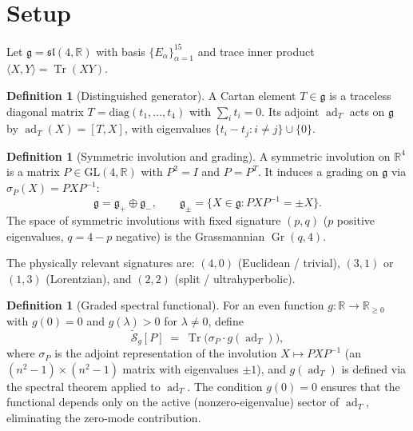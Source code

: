 \documentclass[11pt]{article}
\theoremstyle{plain}
\theoremstyle{definition}
\newtheorem{definition}[theorem]{Definition}
\theoremstyle{remark}
\newcommand{\sln}[1]{\mathfrak{sl}(#1,\mathbb{R})}
\newcommand{\ad}{\operatorname{ad}}
\newcommand{\Tr}{\operatorname{Tr}}
\newcommand{\Gr}{\operatorname{Gr}}
\begin{document}
\section{Setup}

Let $\mathfrak{g} = \sln{4}$ with basis $\{E_\alpha\}_{\alpha=1}^{15}$
and trace inner product $\langle X, Y \rangle = \Tr(XY)$.

\begin{definition}[Distinguished generator]
A Cartan element $T \in \mathfrak{g}$ is a traceless diagonal
matrix $T = \mathrm{diag}(t_1, \ldots, t_4)$ with $\sum_i t_i = 0$.
Its adjoint $\ad_T$ acts on $\mathfrak{g}$ by
$\ad_T(X) = [T, X]$, with eigenvalues
$\{t_i - t_j : i \ne j\} \cup \{0\}$.
\end{definition}

\begin{definition}[Symmetric involution and grading]
A symmetric involution on $\mathbb{R}^4$ is a matrix
$P \in \mathrm{GL}(4,\mathbb{R})$ with $P^2 = I$ and $P = P^T$.
It induces a grading on $\mathfrak{g}$ via $\sigma_P(X) = PXP^{-1}$:
\[
  \mathfrak{g} = \mathfrak{g}_+ \oplus \mathfrak{g}_-,
  \qquad
  \mathfrak{g}_\pm = \{X \in \mathfrak{g} : PXP^{-1} = \pm X\}.
\]
The space of symmetric involutions with fixed signature $(p,q)$
($p$ positive eigenvalues, $q = 4{-}p$ negative) is the
Grassmannian $\Gr(q, 4)$.
\end{definition}

The physically relevant signatures are:
$(4,0)$ (Euclidean / trivial),
$(3,1)$ or $(1,3)$ (Lorentzian),
and $(2,2)$ (split / ultrahyperbolic).

\begin{definition}[Graded spectral functional]
\label{def:functional}
For an even function $g : \mathbb{R} \to \mathbb{R}_{\ge 0}$ with
$g(0) = 0$ and $g(\lambda) > 0$ for $\lambda \ne 0$, define
\begin{equation}\label{eq:S-f}
  \widetilde{\mathcal{S}}_g[P]
  \;=\;
  \Tr\bigl(\sigma_P \cdot g(\ad_T)\bigr),
\end{equation}
where $\sigma_P$ is the adjoint representation of the involution
$X \mapsto PXP^{-1}$ (an $(n^2{-}1) \times (n^2{-}1)$ matrix with
eigenvalues $\pm 1$), and $g(\ad_T)$ is defined via the spectral
theorem applied to $\ad_T$.  The condition $g(0) = 0$ ensures that
the functional depends only on the active (nonzero-eigenvalue) sector
of $\ad_T$, eliminating the zero-mode contribution.
\end{definition}
\end{document}
